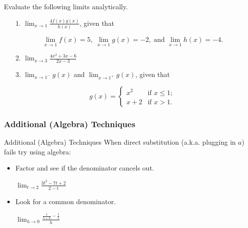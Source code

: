 \documentclass[cal1spr16Lectures.tex]{subfiles}
\begin{document}
\begin{frame}\footnotesize
\begin{exe} Evaluate the following limits analytically.
\begin{itemize}
\item[1.\quad] $\lim_{x \to 1}\frac{4f(x)g(x)}{h(x)}$, given that 

\vspace{-0.25pc}
\[\lim_{x \to 1} f(x)=5, \; \lim_{x \to 1} g(x)=-2, \;\text{and }\lim_{x \to 1} h(x)=-4.\]

\vspace{0.1pc}
\item[2.\quad] $\lim_{x \to 3} \frac{4x^2+3x-6}{2x-3}$

\vspace{0.5pc}
\item[3.\quad] $\lim_{x \to 1^-}g(x)$ \;and\; $\lim_{x \to 1^+}g(x)$, given that

\vspace{-0.25pc}
\[g(x) = 
\begin{cases}
x^2 & \text{if $x \le 1$}; \\
x+2 & \text{if $x>1$}.
\end{cases}
\] 
\end{itemize}
\end{exe}
\end{frame}

\subsubsection{Additional (Algebra) Techniques}
\begin{frame}{\small Additional (Algebra) Techniques}\footnotesize
When direct substitution (a.k.a. plugging in $a$) fails try using algebra:

\vspace{0.25pc}
\begin{itemize}
\item Factor and see if the denominator cancels out.
\begin{ex} $\lim_{t \to 2} \frac{3t^2-7t+2}{2-t}$ \end{ex}

\vspace{0.25pc}
\item Look for a common denominator.
\begin{ex} $\lim_{h \to 0} \frac{ \frac{1}{5+h}-\frac{1}{5} }{h}$ \end{ex}
\end{itemize}
\end{frame}
\end{document}
